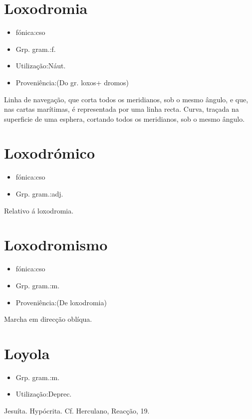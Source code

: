 \section{Loxodromia}
\begin{itemize}
\item {fónica:cso}
\end{itemize}
\begin{itemize}
\item {Grp. gram.:f.}
\end{itemize}
\begin{itemize}
\item {Utilização:Náut.}
\end{itemize}
\begin{itemize}
\item {Proveniência:(Do gr. \textunderscore loxos\textunderscore  + \textunderscore dromos\textunderscore )}
\end{itemize}
Linha de navegação, que corta todos os meridianos, sob o mesmo ângulo, e que, nas cartas marítimas, é representada por uma linha recta.
Curva, traçada na superficie de uma esphera, cortando todos os meridianos, sob o mesmo ângulo.
\section{Loxodrómico}
\begin{itemize}
\item {fónica:cso}
\end{itemize}
\begin{itemize}
\item {Grp. gram.:adj.}
\end{itemize}
Relativo á loxodromia.
\section{Loxodromismo}
\begin{itemize}
\item {fónica:cso}
\end{itemize}
\begin{itemize}
\item {Grp. gram.:m.}
\end{itemize}
\begin{itemize}
\item {Proveniência:(De \textunderscore loxodromia\textunderscore )}
\end{itemize}
Marcha em direcção oblíqua.
\section{Loyola}
\begin{itemize}
\item {Grp. gram.:m.}
\end{itemize}
\begin{itemize}
\item {Utilização:Deprec.}
\end{itemize}
Jesuíta.
Hypócrita. Cf. Herculano, \textunderscore Reacção\textunderscore , 19.
